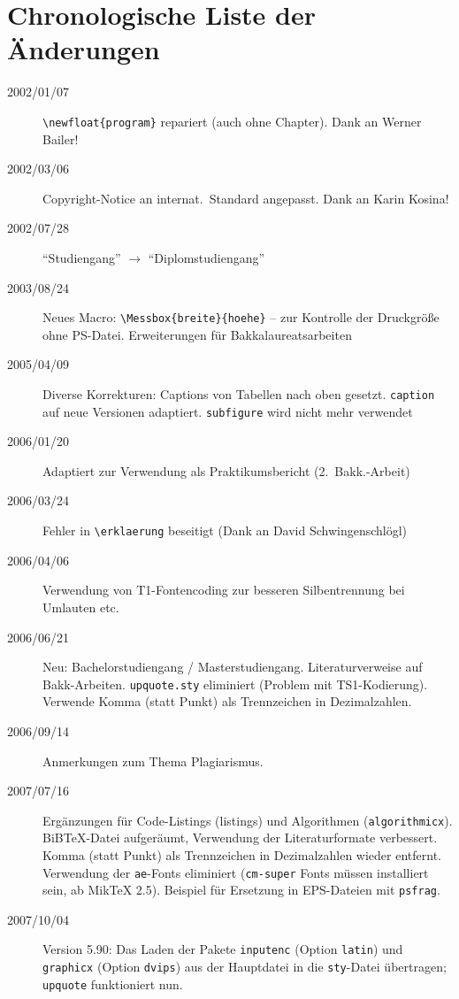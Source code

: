 \chapter{Chronologische Liste der Änderungen}


\begin{sloppypar}
\begin{description}
%
\item[2002/01/07]
\verb!\newfloat{program}! repariert (auch ohne Chapter). Dank an Werner Bailer!
%
\item[2002/03/06]
Copyright-Notice an internat.\ Standard angepasst. Dank an Karin Kosina!
%
\item[2002/07/28]
"`Studiengang"' $\rightarrow$ "`Diplomstudiengang"'
%
\item[2003/08/24]
Neues Macro: \verb!\Messbox{breite}{hoehe}! -- zur Kontrolle der 
Druckgröße ohne PS-Datei. Erweiterungen für Bakkalaureatsarbeiten
%
\item[2005/04/09]
Diverse Korrekturen: Captions von Tabellen nach oben gesetzt. 
\texttt{caption} auf neue Versionen adaptiert.
\texttt{subfigure} wird nicht mehr verwendet
%
\item[2006/01/20]
Adaptiert zur Verwendung als Praktikumsbericht 
(2.\ Bakk.-Arbeit)
%
\item[2006/03/24]
Fehler in \verb!\erklaerung! beseitigt (Dank an David Schwingenschlögl)
%
\item[2006/04/06]
Verwendung von T1-Fontencoding zur besseren Silbentrennung bei 
Umlauten etc.
%
\item[2006/06/21]
Neu: Bachelorstudiengang / Masterstudiengang.
Literaturverweise auf Bakk-Arbeiten.
\texttt{upquote.sty} eliminiert (Problem mit TS1-Kodierung).
Verwende Komma (statt Punkt) als Trennzeichen in Dezimalzahlen.
%
\item[2006/09/14]
Anmerkungen zum Thema Plagiarismus.
%
\item[2007/07/16]
Ergänzungen für Code-Listings (listings) und Algorithmen 
(\texttt{algorithmicx}).
BiBTeX-Datei aufgeräumt, Verwendung der Literaturformate 
verbessert.
Komma (statt Punkt) als Trennzeichen in Dezimalzahlen wieder 
entfernt.
Verwendung der \texttt{ae}-Fonts eliminiert (\texttt{cm-super} Fonts müssen 
installiert sein, ab MikTeX 2.5). 
Beispiel für Ersetzung in EPS-Dateien mit \texttt{psfrag}.
%
\item[2007/10/04]
Version 5.90: Das Laden der Pakete \verb!inputenc! (Option \texttt{latin}) und 
\verb!graphicx! (Option \texttt{dvips})
aus der Hauptdatei in die \texttt{sty}-Datei übertragen; \texttt{upquote} funktioniert nun.

\end{description}
\end{sloppypar}
